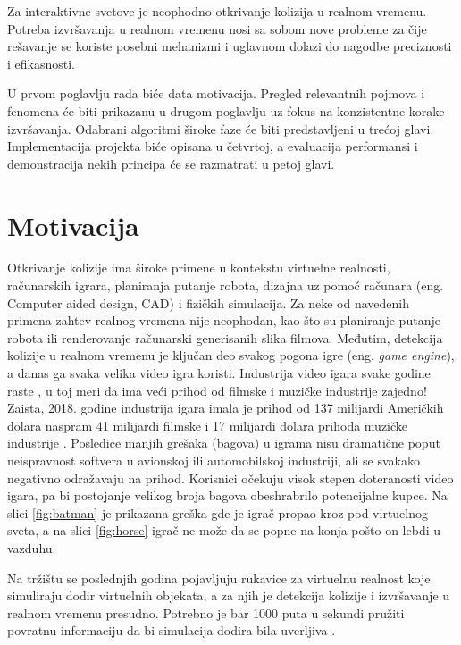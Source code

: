 \documentclass[12pt,oneside]{memoir}
\begin{document}
Za interaktivne svetove je neophodno otkrivanje kolizija u realnom vremenu. 
Potreba izvršavanja u realnom vremenu nosi sa sobom nove probleme za čije rešavanje se koriste posebni mehanizmi 
i uglavnom dolazi do nagodbe preciznosti i efikasnosti.


U prvom poglavlju rada biće data motivacija. 
Pregled relevantnih pojmova i fenomena će biti prikazanu u drugom poglavlju uz fokus na konzistentne korake izvršavanja.
Odabrani algoritmi široke faze će biti predstavljeni u trećoj glavi. 
Implementacija projekta biće opisana u četvrtoj, 
a evaluacija performansi i demonstracija nekih principa će se razmatrati u petoj glavi.


\section{Motivacija}
\label{sec:naslov1}
Otkrivanje kolizije ima široke primene u kontekstu virtuelne realnosti, računarskih igrara, planiranja putanje robota,
dizajna uz pomoć računara (eng. {Computer aided design, CAD}) i fizičkih simulacija. 
Za neke od navedenih primena zahtev realnog vremena nije neophodan, kao što su planiranje putanje robota ili renderovanje računarski generisanih slika filmova.
Međutim, detekcija kolizije u realnom vremenu je ključan deo svakog pogona igre (eng. {\em game engine}), a danas ga svaka velika
video igra koristi. Industrija video igara svake godine raste \cite{game_industry},
u toj meri da ima veći prihod od filmske i muzičke industrije zajedno! Zaista, 2018. godine industrija igara imala je prihod od
137 milijardi Američkih dolara naspram 41 milijardi filmske i 17 milijardi dolara prihoda muzičke industrije \cite{music, movie, game_industry}.
Posledice manjih grešaka (bagova) u igrama nisu dramatične poput neispravnost softvera u avionskoj ili automobilskoj industriji, ali 
se svakako negativno odražavaju na prihod.
Korisnici očekuju visok stepen doteranosti video igara, pa bi postojanje velikog broja bagova 
obeshrabrilo potencijalne kupce. Na slici \ref{fig:batman} je prikazana greška gde je igrač propao kroz
pod virtuelnog sveta, a na slici \ref{fig:horse} igrač ne može da se popne na konja pošto on lebdi u vazduhu.

Na tržištu se poslednjih godina pojavljuju rukavice za virtuelnu realnost koje simuliraju dodir virtuelnih objekata, a za njih je 
detekcija kolizije i izvršavanje u realnom vremenu presudno.
Potrebno je bar 1000 puta u sekundi pružiti povratnu informaciju da bi simulacija dodira bila uverljiva \cite{haptic}. 
\end{document}
